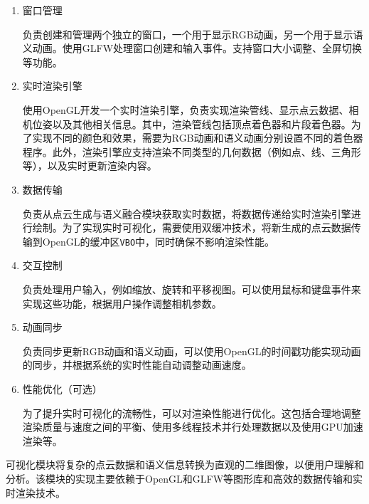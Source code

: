 \begin{enumerate}
	\item{窗口管理}
	\par 负责创建和管理两个独立的窗口，一个用于显示RGB动画，另一个用于显示语义动画。使用GLFW处理窗口创建和输入事件。支持窗口大小调整、全屏切换等功能。

	\item{实时渲染引擎}
	\par 使用OpenGL开发一个实时渲染引擎，负责实现渲染管线、显示点云数据、相机位姿以及其他相关信息。其中，渲染管线包括顶点着色器和片段着色器。为了实现不同的颜色和效果，需要为RGB动画和语义动画分别设置不同的着色器程序。此外，渲染引擎应支持渲染不同类型的几何数据（例如点、线、三角形等），以及实时更新渲染内容。

	\item{数据传输}
	\par 负责从点云生成与语义融合模块获取实时数据，将数据传递给实时渲染引擎进行绘制。为了实现实时可视化，需要使用双缓冲技术，将新生成的点云数据传输到OpenGL的缓冲区\texttt{VBO}中，同时确保不影响渲染性能。

	\item{交互控制}
	\par 负责处理用户输入，例如缩放、旋转和平移视图。可以使用鼠标和键盘事件来实现这些功能，根据用户操作调整相机参数。

	\item{动画同步}
	\par 负责同步更新RGB动画和语义动画，可以使用OpenGL的时间戳功能实现动画的同步，并根据系统的实时性能自动调整动画速度。

	\item{性能优化（可选）}
	\par 为了提升实时可视化的流畅性，可以对渲染性能进行优化。这包括合理地调整渲染质量与速度之间的平衡、使用多线程技术并行处理数据以及使用GPU加速渲染等。
\end{enumerate}

\par 可视化模块将复杂的点云数据和语义信息转换为直观的二维图像，以便用户理解和分析。该模块的实现主要依赖于OpenGL和GLFW等图形库和高效的数据传输和实时渲染技术。

